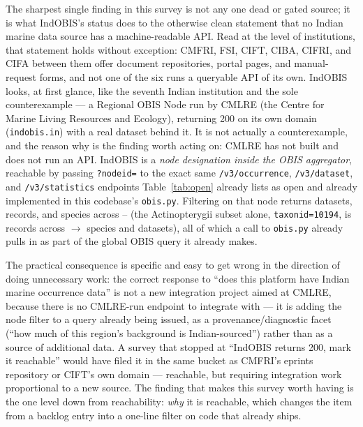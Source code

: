 The sharpest single finding in this survey is not any one dead or gated
source; it is what IndOBIS's status does to the otherwise clean statement
that no Indian marine data source has a machine-readable API. Read at the
level of institutions, that statement holds without exception: CMFRI, FSI,
CIFT, CIBA, CIFRI, and CIFA between them offer document repositories, portal
pages, and manual-request forms, and not one of the six runs a queryable API
of its own. IndOBIS looks, at first glance, like the seventh Indian
institution and the sole counterexample --- a Regional OBIS Node run by
CMLRE (the Centre for Marine Living Resources and Ecology), returning 200 on
its own domain (\texttt{indobis.in}) with a real dataset behind it. It is
not actually a counterexample, and the reason why is the finding worth
acting on: CMLRE has not built and does not run an API. IndOBIS is a
\emph{node designation inside the OBIS aggregator}, reachable by passing
\texttt{?nodeid=\IndObisNodeId{}} to the exact same
\texttt{/v3/occurrence}, \texttt{/v3/dataset}, and \texttt{/v3/statistics}
endpoints Table~\ref{tab:open} already lists as open and already implemented
in this codebase's \texttt{obis.py}. Filtering on that node returns
\IndObisDatasets{} datasets, \IndObisRecords{} records, and
\IndObisSpecies{} species across \IndObisYearStart{}--\IndObisYearEnd{}
(the Actinopterygii subset alone, \texttt{taxonid=10194}, is
\IndObisActinoRecords{} records across \IndObisSpecies{} $\to$
\IndObisActinoSpecies{} species and \IndObisActinoDatasets{} datasets), all
of which a call to \texttt{obis.py} already pulls in as part of the global
OBIS query it already makes.

The practical consequence is specific and easy to get wrong in the direction
of doing unnecessary work: the correct response to ``does this platform have
Indian marine occurrence data'' is not a new integration project aimed at
CMLRE, because there is no CMLRE-run endpoint to integrate with --- it is
adding the node filter to a query already being issued, as a
provenance/diagnostic facet (``how much of this region's background is
Indian-sourced'') rather than as a source of additional data. A survey that
stopped at ``IndOBIS returns 200, mark it reachable'' would have filed it
in the same bucket as CMFRI's eprints repository or CIFT's own domain ---
reachable, but requiring integration work proportional to a new source. The
finding that makes this survey worth having is the one level down from
reachability: \emph{why} it is reachable, which changes the item from a
backlog entry into a one-line filter on code that already ships.

